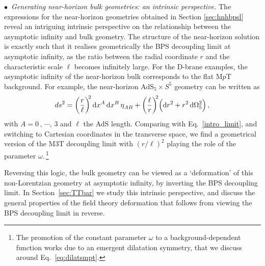 \documentclass[11pt]{article}
\renewcommand{\emph}[1]{\textit{#1}}
\newcommand{\dd}{\mathrm{d}}
\begin{document}
\noindent $\bullet$~\emph{Generating near-horizon bulk geometries: an intrinsic perspective.} The expressions for the near-horizon geometries obtained in Section \ref{sec:hnhbpsl} reveal an intriguing intrinsic perspective on the relationship between the asymptotic infinity and bulk geometry.
The structure of the near-horizon solution is exactly such that it realises geometrically the BPS decoupling limit at asymptotic infinity, as the ratio between the radial coordinate $r$ and the characteristic scale $\ell$ becomes infinitely large.
For the D-brane examples, the asymptotic infinity of the near-horizon bulk corresponds to the flat M$p$T background.
For example, the near-horizon AdS${}_5 \times S^5$ geometry can be written as
%
\begin{align} \label{intro_ads}
    ds^2 = \biggl(\frac{r}{\ell}\biggr)^{\!\!2} \, \dd x^A \, \dd x^B \, \eta^{}_{AB}  + \biggl(\frac{\ell}{r}\biggr)^{\!\!2} \Bigl( \dd r^2 + r^2 \, \dd\Omega_5^2 \Bigr)\,,
\end{align}
%
with $A=0\,,\,\cdots,\, 3$ and $\ell$ the AdS length.
Comparing with Eq.~\eqref{intro_limit}, and switching to Cartesian coordinates in the transverse space, we find a geometrical version of the M3T decoupling limit with $(r/\ell)^2$ playing the role of the parameter $\omega$.\,\footnote{The promotion of the constant parameter $\omega$ to a background-dependent function works due to an emergent dilatation symmetry, that we discuss around Eq.~\eqref{eq:dilatsmpt}.}

Reversing this logic, the bulk geometry can be viewed as a `deformation' of this non-Lorentzian geometry at asymptotic infinity, by inverting the BPS decoupling limit.
In Section~\ref{sec:TTbar} we study this intrinsic perspective, and discuss the general properties of the field theory deformation that follows from viewing the BPS decoupling limit in reverse.
\end{document}
